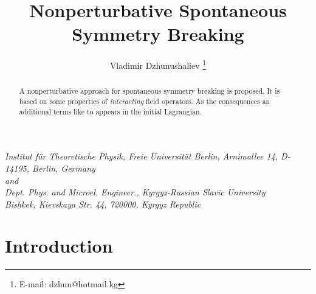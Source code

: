 \documentclass[a4paper,a4paper]{article}
\title{Nonperturbative Spontaneous Symmetry Breaking}
\author{Vladimir Dzhunushaliev
\thanks{
E-mail: dzhun@hotmail.kg}}
\begin{document}
\maketitle

\begin{center}
\textit{
Institut f\"ur Theoretische Physik,  
Freie Universit\"at Berlin, Arnimallee 14, D-14195, Berlin, Germany\\
and \\
Dept. Phys. and Microel. Engineer., Kyrgyz-Russian
Slavic University\\
Bishkek, Kievskaya Str. 44, 720000, Kyrgyz
Republic}
\end{center}

\begin{abstract}
A nonperturbative approach for  spontaneous symmetry breaking 
is proposed. It is based on some properties of \textit{interacting} field 
operators. As the consequences an additional terms like to 
\coordHE{} appears in the initial Lagrangian. 
\end{abstract}

\section{Introduction}
\end{document}
